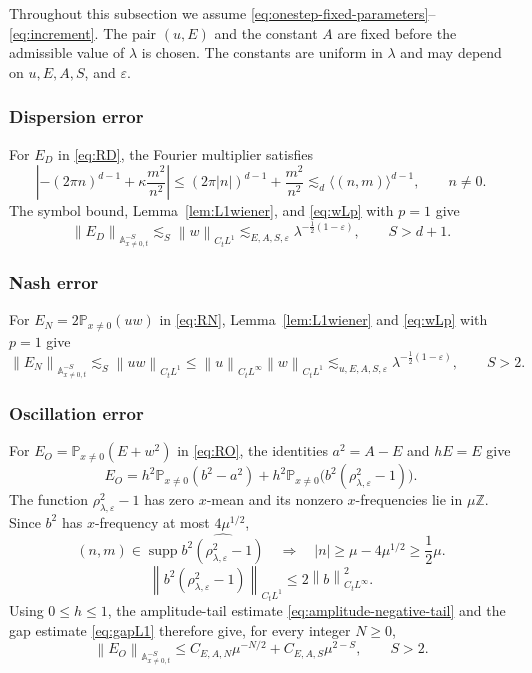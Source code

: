 \documentclass[12pt,reqno,letterpaper]{amsart}
\numberwithin{equation}{section}
\theoremstyle{definition}
\newcommand{\Z}{\mathbb Z}
\newcommand{\A}{\mathbb A}
\newcommand{\eps}{\varepsilon}
\newcommand{\la}{\lambda}
\newcommand{\supp}{\operatorname{supp}}
\newcommand{\norm}[1]{\left\lVert #1\right\rVert}
\newcommand{\abs}[1]{\left\lvert #1\right\rvert}
\begin{document}
Throughout this subsection we assume
\eqref{eq:onestep-fixed-parameters}--\eqref{eq:increment}.  The pair $(u,E)$
and the constant $A$ are fixed before the admissible value of $\la$
is chosen.  The constants are uniform in $\la$ and may depend on
$u,E,A,S$, and $\eps$.

\subsubsection*{Dispersion error}

For $E_D$ in \eqref{eq:RD}, the Fourier multiplier satisfies
\begin{equation*}
 \abs{-(2\pi n)^{d-1}+\kappa\frac{m^2}{n^2}}
 \leq(2\pi\abs n)^{d-1}+\frac{m^2}{n^2}
 \lesssim_d\langle(n,m)\rangle^{d-1},
 \qquad n\neq0.
\end{equation*}
The symbol bound, Lemma~\ref{lem:L1wiener}, and \eqref{eq:wLp} with
$p=1$ give
\begin{equation}\label{eq:RDestimate}
    \norm{E_D}_{\A^{-S}_{x\neq0,t}}
    \lesssim_S\norm{w}_{C_tL^1}
    \lesssim_{E,A,S,\eps}\la^{-\frac12(1-\eps)},
    \qquad S>d+1.
\end{equation}
\subsubsection*{Nash error}

For $E_N=2\mathbb P_{x\neq0}(uw)$ in \eqref{eq:RN},
Lemma~\ref{lem:L1wiener} and \eqref{eq:wLp} with $p=1$ give
\begin{equation}\label{eq:RNestimate}
    \norm{E_N}_{\A^{-S}_{x\neq0,t}}
    \lesssim_S\norm{uw}_{C_tL^1}
    \leq\norm u_{C_tL^\infty}\norm w_{C_tL^1}
    \lesssim_{u,E,A,S,\eps}\la^{-\frac12(1-\eps)},
    \qquad S>2.
\end{equation}

\subsubsection*{Oscillation error}

For $E_O=\mathbb P_{x\neq0}(E+w^2)$ in \eqref{eq:RO}, the identities
$a^2=A-E$ and $hE=E$ give
\begin{equation*}
    E_O
    =h^2\mathbb P_{x\neq0}(b^2-a^2)
     +h^2\mathbb P_{x\neq0}
       \bigl(b^2(\rho_{\la,\eps}^2-1)\bigr).
\end{equation*}
The function $\rho_{\la,\eps}^2-1$ has zero $x$-mean and its nonzero
$x$-frequencies lie in $\mu\Z$.  Since $b^2$ has $x$-frequency at most
$4\mu^{1/2}$,
\begin{equation*}
 (n,m)\in\supp\widehat{b^2(\rho_{\la,\eps}^2-1)}
 \quad\Longrightarrow\quad
 \abs n\geq\mu-4\mu^{1/2}\geq\frac12\mu.
\end{equation*}
\[
   \norm{b^2(\rho_{\la,\eps}^2-1)}_{C_tL^1}
      \leq2\norm{b}_{C_tL^\infty}^2.
\]
Using $0\leq h\leq1$, the amplitude-tail estimate
\eqref{eq:amplitude-negative-tail} and the gap estimate
\eqref{eq:gapL1} therefore give, for every integer $N\geq0$,
\begin{equation}\label{eq:ROestimate}
    \norm{E_O}_{\A^{-S}_{x\neq0,t}}
    \leq C_{E,A,N}\mu^{-N/2}
       +C_{E,A,S}\mu^{2-S},
    \qquad S>2.
\end{equation}
\end{document}
